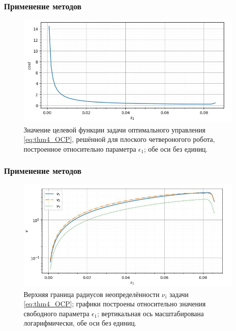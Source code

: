 \begin{frame}
	\frametitle{Применение методов}
	\begin{figure}
		\centering
		\includegraphics[scale=0.85]{images/mult_soft_cost_qp_eps.JPG}
		\caption{Значение целевой функции задачи оптимального управления \eqref{eq:thm4_OCP}, решённой для плоского четвероногого робота, построенное относительно параметра $\epsilon_1$; обе оси без единиц.}
		\label{fig:cost}
	\end{figure}
\end{frame}

\begin{frame}
	\frametitle{Применение методов}
	\begin{figure}
		\centering
		\includegraphics[scale=0.8]{images/mult_soft_nu_eps_qp.JPG}
		\caption{Верхняя граница радиусов неопределённости $\nu_i$ задачи \eqref{eq:thm4_OCP}; графики построены относительно значения свободного параметра $\epsilon_1$; вертикальная ось масштабирована логарифмически, обе оси без единиц.}
		\label{fig:cost_qp}
	\end{figure}
\end{frame}

